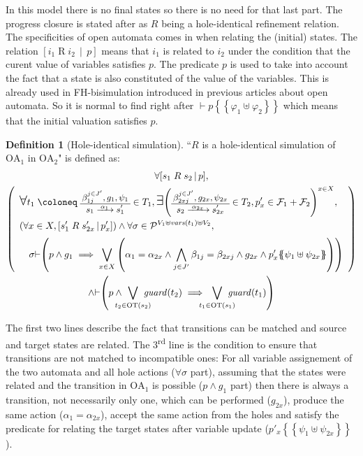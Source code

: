 \documentclass{article}
\theoremstyle{plain}
\theoremstyle{definition}
\newtheorem{defi}{Definition}
\newcommand\nmm[1]{\(\displaystyle #1\)} %
\newcommand\mpar[1]{{\left(#1\right)}}
\newcommand\mbrk[1]{{\left[#1\right]}}
\newcommand\mbrc[1]{{\left\{#1\right\}}}
\newcommand\psubst[1]{\mbrc{\!\!\mbrc{#1}\!\!}}
\newcommand\midbar{\,\middle|\,}
\newcommand\prel[4]{\mbrk{#2\mathrel{#1}#3\midbar #4}}
\newcommand\subbox[1]{{\makebox[.5\width]{\(\scriptstyle #1\)}}}
\newcommand\bigsymb[2][\Large]{\text{#1\nmm{#2}}}
\newcommand\defobject{\DOTSB\;{\coloneq}\;}
\newcommand\sat{{\vdash}} %
\newcommand\fvars[1]{{\mathit{vars}\mpar{#1}}}
\newcommand\fformulae[1]{{\mathcal{F}}}
\newcommand\fvalues[1]{{\mathcal{P}}}
\newcommand\OT[6]{\text{\small\(%
	\setlength\arraycolsep{2pt}\everymath{\displaystyle}%
	\begin{array}{c}%
	#4,#5,#6 \\\hline
	#1\xrightarrow{\raisebox{-1.5pt}[.8\height][0pt]{\makebox[1.4\width]{\(\scriptstyle #3\)}}}#2
	\end{array}\)}}
\newcommand\OTx[4]{\OT{s_{#1}}{s'_{#1 #2}}{\alpha_{#1 #2}}{\beta_{#3 j}^{j \in J'_{#4}}}{g_{#1 #2}}{\psi_{#1 #2}}}
\begin{document}
In this model there is no final states so there is no need for that last part.
The progress closure is stated after as \(R\) being a hole-identical refinement relation.
The specificities of open automata comes in when relating the (initial) states.
The relation \(\prel{R}{i_1}{i_2}{p}\) means that \(i_1\) is related to \(i_2\) under the condition that the curent value of variables satisfies \(p\).
The predicate \(p\) is used to take into account the fact that a state is also constituted of the value of the variables.
This is already used in FH-bisimulation introduced in previous articles about open automata.
So it is normal to find right after \(\vdash p\psubst{\varphi_1 \uplus \varphi_2}\) which means that the initial valuation satisfies \(p\).
\begin{defi}[Hole-identical simulation]
``\(R\) is a hole-identical simulation of \(\mathrm{OA}_1\) in \(\mathrm{OA}_2\)" is defined as:
\begin{multline*}
	\forall \prel{R}{s_1}{s_2}{p}, \\
	\mpar{\everymath{\displaystyle}\begin{array}{l}
		\bigsymb{\forall} t_1 \defobject \OTx{1}{}{1}{} \in T_1, \bigsymb{\exists} \mpar{\OTx{2}{x}{2x}{} \in T_2, p'_x \in \fformulae{E}_1 + \fformulae{E}_2}^{x \in X}, \\[12pt]
		\mpar{\forall x \in X, \prel{R}{s'_1}{s'_{2x}}{p'_x}} \wedge \forall \sigma \in \fvalues{E_1}^{V_1 \uplus \fvars{t_1} \uplus V_2}, \\[6pt]
		\quad \sigma \sat\mpar{p \wedge g_1 \implies \bigvee_{x \in X} \mpar{\alpha_1 = \alpha_{2x} \wedge \bigwedge_{j \in J'} \beta_{1j} = \beta_{2xj} \wedge g_{2x} \wedge p'_x\psubst{\psi_1 \uplus \psi_{2x}}}} \\[12pt]
	\end{array}} \\
	\wedge \sat\mpar{p \wedge \bigvee_\subbox{t_2 \in \mathrm{OT}\mpar{s_2}} \mathit{guard}\mpar{t_2} \implies \bigvee_\subbox{t_1 \in \mathrm{OT}\mpar{s_1}} \mathit{guard}\mpar{t_1}}
\end{multline*}
\end{defi}
The first two lines describe the fact that transitions can be matched and source and target states are related.
The 3\textsuperscript{rd} line is the condition to ensure that transitions are not matched to incompatible ones:
For all variable assignement of the two automata and all hole actions (\(\forall \sigma\) part), assuming that the states were related and the transition in \(\mathrm{OA}_1\) is possible (\(p \wedge g_1\) part) then there is always a transition, not necessarily only one, which can be performed (\(g_{2x}\)), produce the same action (\(\alpha_1 = \alpha_{2x}\)), accept the same action from the holes and satisfy the predicate for relating the target states after variable update (\(p'_x\psubst{\psi_1 \uplus \psi_{2x}}\)).
\end{document}
